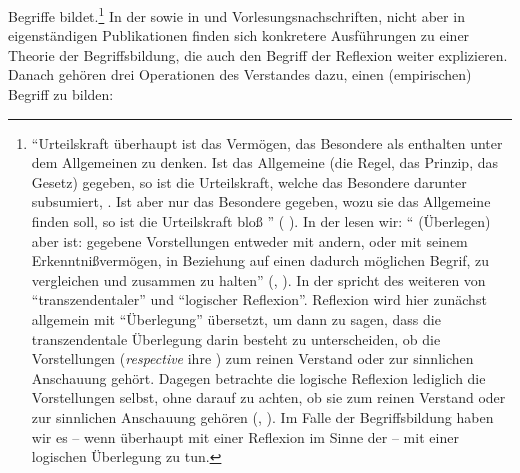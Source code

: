 Begriffe bildet.\footnote{\enquote{Urteilskraft überhaupt ist das Vermögen, das Besondere als enthalten unter dem
Allgemeinen zu denken. Ist das Allgemeine (die Regel, das Prinzip, das Gesetz)
gegeben, so ist die Urteilskraft, welche das Besondere darunter subsumiert,
{\punkt} . Ist aber nur das Besondere gegeben, wozu sie das
Allgemeine finden soll, so ist die Urteilskraft bloß
} \mkbibparens{\cite[][B
xxv\,f.,]{Kant:KritikderUrteilskraft2009}
\cite[][V: 179.19--26]{Kant:GesammelteWerke1900ff.}}. In der  lesen wir: \enquote{ (Überlegen) aber ist:
gegebene Vorstellungen entweder mit andern, oder mit seinem
Erkenntnißvermögen, in Beziehung auf einen dadurch möglichen Begrif, zu
vergleichen und zusammen zu halten}
\mkbibparens{\cite[][16]{Kant:ErsteEinleitungindieenquoteKritikderUrteilskraft2009},
\cite[][XX: 211.14--16]{Kant:GesammelteWerke1900ff.}}. In der  spricht  des weiteren von \enquote{transzendentaler} und
\enquote{logischer Reflexion}. Reflexion wird hier zunächst allgemein mit
\enquote{Überlegung} übersetzt, um dann zu sagen, dass die transzendentale
Überlegung darin besteht zu unterscheiden, ob die Vorstellungen
(\emph{respective} ihre ) zum reinen Verstand oder zur
sinnlichen Anschauung gehört. Dagegen betrachte die logische Reflexion lediglich
die Vorstellungen selbst, ohne darauf zu achten, ob sie zum reinen Verstand oder
zur sinnlichen Anschauung gehören \mkbibparens{\cite[vgl.][B
316--319]{Kant:KritikderreinenVernunft2003}, \cite[][III:
214.33--216.28]{Kant:GesammelteWerke1900ff.}}. Im Falle der Begriffsbildung
haben wir es -- wenn überhaupt mit einer Reflexion im Sinne der  -- mit einer logischen Überlegung zu tun.}
In der {\jaeschelogik} sowie in  und
Vorlesungsnachschriften, nicht aber in eigenständigen Publikationen finden sich
konkretere Ausführungen zu einer Theorie der Begriffsbildung, die auch den
Begriff der Reflexion weiter explizieren. Danach gehören drei Operationen des
Verstandes dazu, einen (empirischen) Begriff zu bilden:
